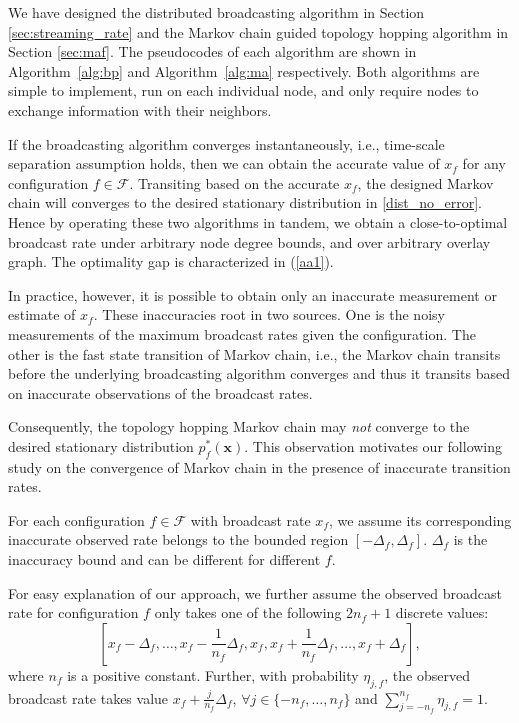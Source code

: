 \documentclass[10pt,conference]{IEEEtran}
\begin{document}
We have designed the distributed broadcasting algorithm in Section
\ref{sec:streaming_rate} and the Markov chain guided topology hopping
algorithm in Section \ref{sec:maf}. The pseudocodes of each algorithm
are shown in Algorithm~\ref{alg:bp} and Algorithm~\ref{alg:ma} respectively.
Both algorithms are simple to implement, run on each individual node,
and only require nodes to exchange information with their neighbors.

If the broadcasting algorithm converges instantaneously, i.e., time-scale
separation assumption holds, then we can obtain the accurate value
of $x_{f}$ for any configuration $f\in\mathcal{F}$. Transiting based
on the accurate $x_{f}$, the designed Markov chain will converges
to the desired stationary distribution in \eqref{dist_no_error}.
Hence by operating these two algorithms in tandem, we obtain a close-to-optimal
broadcast rate under arbitrary node degree bounds, and over arbitrary
overlay graph. The optimality gap is characterized in (\ref{aa1}).

In practice, however, it is possible to obtain only an inaccurate
measurement or estimate of $x_{f}$. These inaccuracies root in two
sources. One is the noisy measurements of the maximum broadcast rates
given the configuration. The other is the fast state transition of
Markov chain, i.e., the Markov chain transits before the underlying
broadcasting algorithm converges and thus it transits based on inaccurate
observations of the broadcast rates.

Consequently, the topology hopping Markov chain may \emph{not} converge
to the desired stationary distribution $p_{f}^{*}(\boldsymbol{x})$.
This observation motivates our following study on the convergence
of Markov chain in the presence of inaccurate transition rates.

For each configuration $f\in\mathcal{F}$ with broadcast rate $x_{f}$,
we assume its corresponding inaccurate observed rate belongs to the
bounded region $\left[-\Delta_{f},\Delta_{f}\right]$. $\Delta_{f}$
is the inaccuracy bound and can be different for different $f$.

For easy explanation of our approach, we further assume the observed
broadcast rate for configuration $f$ only takes one of the following
$2n_{f}+1$ discrete values: \[
\left[x_{f}-\Delta_{f},\ldots,x_{f}-\frac{1}{n_{f}}\Delta_{f},x_{f},x_{f}+\frac{1}{n_{f}}\Delta_{f},\ldots,x_{f}+\Delta_{f}\right],\]
 where $n_{f}$ is a positive constant. Further, with probability
$\eta_{j,f}$, the observed broadcast rate takes value
$x_{f}+\frac{j}{n_{f}}\Delta_{f}$, $\forall
j\in\{-n_{f},\ldots,n_{f}\}$ and
$\sum_{j=-n_{f}}^{n_{f}}\eta_{j,f}=1$.
\end{document}
